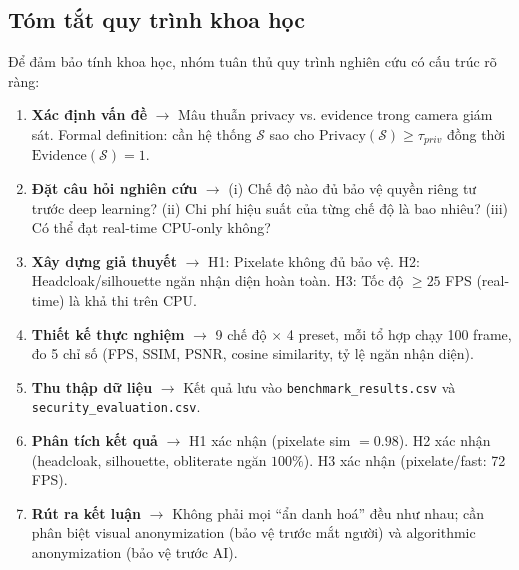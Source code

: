 \medskip

\subsection{Tóm tắt quy trình khoa học}
\label{subsec:quytrinhkhoa}

Để đảm bảo tính khoa học, nhóm tuân thủ quy trình nghiên cứu có cấu trúc rõ ràng:

\begin{enumerate}[label=\textbf{Bước \arabic*.}]
    \item \textbf{Xác định vấn đề} $\rightarrow$ Mâu thuẫn privacy vs. evidence trong camera giám sát. Formal definition: cần hệ thống $\mathcal{S}$ sao cho $\text{Privacy}(\mathcal{S}) \geq \tau_{priv}$ đồng thời $\text{Evidence}(\mathcal{S}) = 1$.
    
    \item \textbf{Đặt câu hỏi nghiên cứu} $\rightarrow$ (i) Chế độ nào đủ bảo vệ quyền riêng tư trước deep learning? (ii) Chi phí hiệu suất của từng chế độ là bao nhiêu? (iii) Có thể đạt real-time CPU-only không?
    
    \item \textbf{Xây dựng giả thuyết} $\rightarrow$ H1: Pixelate không đủ bảo vệ. H2: Headcloak/silhouette ngăn nhận diện hoàn toàn. H3: Tốc độ $\geq 25$ FPS (real-time) là khả thi trên CPU.
    
    \item \textbf{Thiết kế thực nghiệm} $\rightarrow$ 9 chế độ $\times$ 4 preset, mỗi tổ hợp chạy 100 frame, đo 5 chỉ số (FPS, SSIM, PSNR, cosine similarity, tỷ lệ ngăn nhận diện).
    
    \item \textbf{Thu thập dữ liệu} $\rightarrow$ Kết quả lưu vào \texttt{bench\allowbreak{}mark\_results.csv} và \texttt{se\allowbreak{}cu\allowbreak{}rity\_eva\allowbreak{}lu\allowbreak{}ation.csv}.
    
    \item \textbf{Phân tích kết quả} $\rightarrow$ H1 xác nhận (pixelate sim $=0.98$). H2 xác nhận (headcloak, silhouette, obliterate ngăn $100\%$). H3 xác nhận (pixelate/fast: 72 FPS).
    
    \item \textbf{Rút ra kết luận} $\rightarrow$ Không phải mọi ``ẩn danh hoá'' đều như nhau; cần phân biệt visual anonymization (bảo vệ trước mắt người) và algorithmic anonymization (bảo vệ trước AI).
\end{enumerate}

